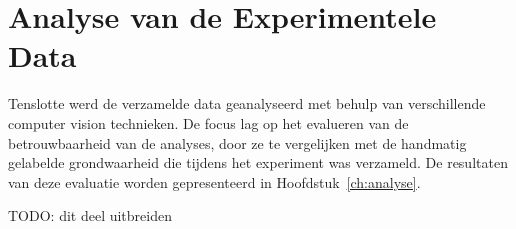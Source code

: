 




\section{Analyse van de Experimentele Data}

Tenslotte werd de verzamelde data geanalyseerd met behulp van verschillende computer vision technieken.
De focus lag op het evalueren van de betrouwbaarheid van de analyses, door ze te vergelijken met de handmatig gelabelde grondwaarheid die tijdens het experiment was verzameld.
De resultaten van deze evaluatie worden gepresenteerd in Hoofdstuk~\ref{ch:analyse}.

TODO: dit deel uitbreiden
